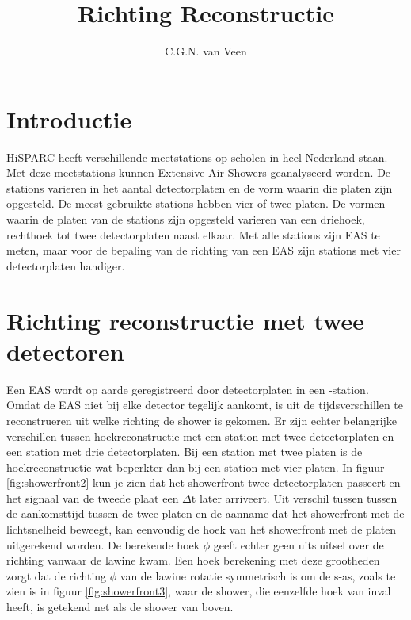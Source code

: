 



\title{Richting Reconstructie}
\author{C.G.N. van Veen} 
\date{}

\maketitle

\section{Introductie}

HiSPARC heeft verschillende meetstations op scholen in heel Nederland staan. 
Met deze meetstations kunnen Extensive Air Showers geanalyseerd worden.
De stations varieren in het aantal detectorplaten en de vorm waarin
die platen zijn opgesteld. De meest gebruikte stations hebben vier of twee platen.
De vormen waarin de platen van de stations zijn opgesteld varieren van een driehoek,
rechthoek tot twee detectorplaten naast elkaar. Met alle stations zijn EAS te meten, maar voor de bepaling van de richting van een EAS zijn 
stations met vier detectorplaten handiger.
  
\section{Richting reconstructie met twee detectoren}

Een EAS wordt op aarde geregistreerd door detectorplaten in een \hisparc-station. 
Omdat de EAS niet bij elke detector tegelijk aankomt, is uit de tijdsverschillen 
te reconstrueren uit welke richting de shower is gekomen. 
Er zijn echter belangrijke verschillen tussen hoekreconstructie met een station met twee detectorplaten en een station met drie detectorplaten. 
Bij een station met twee platen is de hoekreconstructie wat beperkter dan bij een station met vier platen.
In figuur \ref{fig:showerfront2} kun je zien dat het showerfront twee detectorplaten passeert en het signaal van de tweede plaat  een $\Delta$t later arriveert. 
Uit verschil tussen tussen de aankomsttijd tussen de twee platen en de aanname dat het showerfront met de lichtsnelheid beweegt,
 kan eenvoudig de hoek van het showerfront met de platen uitgerekend worden. De berekende hoek $\phi$ geeft echter geen uitsluitsel over de richting vanwaar de lawine kwam.
 Een hoek berekening met deze grootheden zorgt dat de richting $\phi$ van de lawine rotatie symmetrisch is om de s-as, zoals te zien is in figuur \ref{fig:showerfront3}, 
waar de shower, die eenzelfde hoek van inval heeft,  is getekend net als de shower van boven. 

